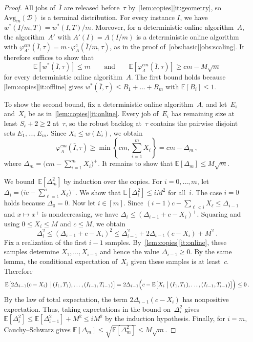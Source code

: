 \documentclass[11pt,letterpaper]{article}
\theoremstyle{definition}
\theoremstyle{remark}
\newcommand{\E}{\mathbb{E}}
\newcommand{\cD}{\mathcal{D}}
\newcommand{\Avg}{\mathrm{Avg}}
\begin{document}
\begin{proof}
All jobs of~$\bar I$ are released before~$\tau$ by~\cref{lem:copies}\ref{it:geometry}, so $\Avg_m(\cD)$ is a terminal distribution. For every instance $I$, we have $w^*(I/m,T)=w^*(I,T)/m$. Moreover, for a deterministic online algorithm~$A$, the algorithm~$A'$ with $A'(I)=A(I/m)$ is a deterministic online algorithm with $\varphi_{A'}^{cm}(\bar I,\tau)=m\cdot\varphi_A^c(\bar I/m,\tau)$, as in the proof of~\cref{obs:basic}\ref{obs:scaling}. It therefore suffices to show that
\begin{equation*}
  \E[w^*(\bar I,\tau)]\le m
  \qquad\text{and}\qquad
  \E[\varphi_A^{cm}(\bar I,\tau)]\ge cm-M\sqrt m
\end{equation*}
for every deterministic online algorithm~$A$. The first bound holds because \cref{lem:copies}\ref{it:offline} gives $w^*(\bar I,\tau)\le B_1+\dots+B_m$ with $\E[B_i]\le1$.

To show the second bound, fix a deterministic online algorithm~$A$, and let~$E_i$ and~$X_i$ be as in~\cref{lem:copies}\ref{it:online}. Every job of~$E_i$ has remaining size at least $S_i+2\ge2$ at~$\tau$, so the robust backlog at~$\tau$ contains the pairwise disjoint sets $E_1,\dots,E_m$. Since $X_i\le w(E_i)$, we obtain
\begin{equation*}
  \varphi_A^{cm}(\bar I,\tau)\ge\min\left\{cm,\sum_{i=1}^mX_i\right\}=cm-\Delta_m\,,
\end{equation*}
where $\Delta_m=\bigl(cm-\sum_{i=1}^mX_i\bigr)^+$. It remains to show that $\E[\Delta_m]\le M\sqrt m$.

We bound~$\E[\Delta_m^2]$ by induction over the copies. For $i=0,\dots,m$, let $\Delta_i=\bigl(ic-\sum_{\ell=1}^iX_\ell\bigr)^+$. We show that $\E[\Delta_i^2]\le iM^2$ for all~$i$. The case $i=0$ holds because $\Delta_0=0$. Now let $i\in[m]$. Since $(i-1)c-\sum_{\ell<i}X_\ell\le \Delta_{i-1}$ and $x\mapsto x^+$ is nondecreasing, we have $\Delta_i\le(\Delta_{i-1}+c-X_i)^+$. Squaring and using $0\le X_i\le M$ and $c\le M$, we obtain
\begin{equation*}
  \Delta_i^2\le(\Delta_{i-1}+c-X_i)^2\le \Delta_{i-1}^2+2\Delta_{i-1}(c-X_i)+M^2\,.
\end{equation*}
Fix a realization of the first $i-1$ samples. By~\cref{lem:copies}\ref{it:online}, these samples determine $X_1,\dots,X_{i-1}$ and hence the value $\Delta_{i-1}\ge0$. By the same lemma, the conditional expectation of~$X_i$ given these samples is at least~$c$. Therefore
\begin{equation*}
  \E\bigl[2\Delta_{i-1}(c-X_i)\bigm|(I_1,T_1),\dots,(I_{i-1},T_{i-1})\bigr]
  =2\Delta_{i-1}\Bigl(c-\E\bigl[X_i\bigm|(I_1,T_1),\dots,(I_{i-1},T_{i-1})\bigr]\Bigr)\le0\,.
\end{equation*}
By the law of total expectation, the term $2\Delta_{i-1}(c-X_i)$ has nonpositive expectation. Thus, taking expectations in the bound on~$\Delta_i^2$ gives $\E[\Delta_i^2]\le\E[\Delta_{i-1}^2]+M^2\le iM^2$ by the induction hypothesis. Finally, for $i=m$, Cauchy--Schwarz gives $\E[\Delta_m]\le\sqrt{\E[\Delta_m^2]}\le M\sqrt m$.
\end{proof}
\end{document}
